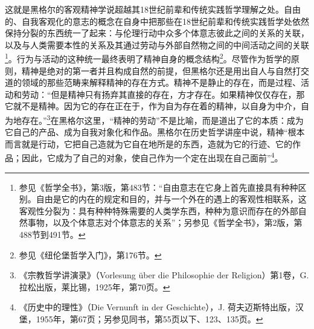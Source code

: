这就是黑格尔的客观精神学说超越其18世纪前辈和传统实践哲学理解之处。自由的、自我客观化的意志的概念在自身中把那些在18世纪前辈和传统实践哲学处依然保持分裂的东西统一了起来：与伦理行动中众多个体意志彼此之间的关系的关联，以及与人类需要本性的关系及其通过劳动与外部自然物之间的中间活动之间的关联\footnote{参见《哲学全书》，第3版，第483节：“自由意志在它身上首先直接具有种种区别。自由是它的内在的规定和目的，并与一个外在的遇上的客观性相联系，这客观性分裂为：具有种种特殊需要的人类学东西，种种为意识而存在的外部自然事物，以及个体意志对个体意志的关系”；另参见《哲学全书》，第2版，第488节到491节。}。行为与活动的这种统一最终表明了精神自身的概念结构\footnote{参见《纽伦堡哲学入门》，第176节。}。尽管作为哲学的原则，精神是绝对的第一者并且构成自然的前提，但黑格尔还是用出自人与自然打交道的领域的那些范畴来解释精神的存在方式。精神不是静止的存在，而是过程、活动和劳动：“但是精神只有扬弃其直接的存在，方才存在。如果精神仅仅存在，那它就不是精神。因为它的存在正在于，作为自为存在着的精神，以自身为中介，自为地存在。”\footnote{《宗教哲学讲演录》（Vorlesung über die Philosophie der Religion）第1卷，G. 拉松出版，莱比锡，1925年，第70页。}在黑格尔这里，“精神的劳动”不是比喻，而是道出了它的本质：成为它自己的产品、成为自我对象化和作品。黑格尔在历史哲学讲座中说，精神“根本而言就是行动，它把自己造就为它自在地所是的东西，造就为它的行迹、它的作品；因此，它成为了自己的对象，使自己作为一个定在出现在自己面前”\footnote{《历史中的理性》（Die Vernunft in der Geschichte），J. 荷夫迈斯特出版，汉堡，1955年，第67页；另参见同书，第55页以下、123、135页。}。

